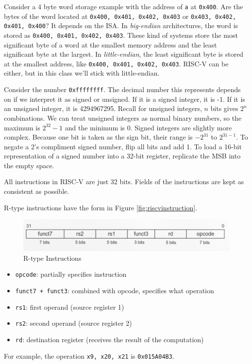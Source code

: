 Consider a 4 byte word storage example with the address
of \texttt{a} at \texttt{0x400}. Are the bytes of the word
located at \texttt{0x400, 0x401, 0x402, 0x403} or
\texttt{0x403, 0x402, 0x401, 0x400}? It depends on the
ISA. In \emph{big-endian} architectures, the word is
stored as \texttt{0x400, 0x401, 0x402, 0x403}. These kind
of systems store the most significant byte of a word at
the smallest memory address and the least significant
byte at the largest. In \emph{little-endian}, the least
significant byte is stored at the smallest address,
like \texttt{0x400, 0x401, 0x402, 0x403}. RISC-V can be
either, but in this class we'll stick with little-endian.

Consider the number \texttt{0xffffffff}.
The decimal number this represents depends
on if we interpret it as signed or unsigned.
If it is a signed integer, it is -1.
If it is an unsigned integer, it is
4294967295. Recall for unsigned integers,
$n$ bits gives $2^n$ combinations. We
can treat unsigned integers as normal
binary numbers, so the maximum is
$2^32 - 1$ and the minimum is 0.
Signed integers are slightly more
complex. Because one bit is taken
as the sign bit, their range is
$-2^{31}$ to $2^{31 - 1}$. To negate
a 2's compliment signed number, flip
all bits and add 1. To load a 16-bit
representation of a signed number into
a 32-bit register, replicate the MSB
into the empty space.

All instructions in RISC-V are just 32 bits.
Fields of the instructions are kept as
consistent as possible.

R-type instructions have the
form in Figure \ref{fig:riscvinstruction}.
\begin{figure}
    \includegraphics{images/rtype.png}
    \caption{R-type Instructions}
    \label{fig:rtype}
\end{figure}
\begin{itemize}
    \item \texttt{opcode}: partially specifies instruction
    \item \texttt{funct7 + funct3}: combined with opcode, specifies what operation
    \item \texttt{rs1}: first operand (source register 1)
    \item \texttt{rs2}: second operand (source register 2)
    \item \texttt{rd}: destination register (receives the result of the computation)
\end{itemize}
For example, the operation \texttt{x9, x20, x21}
is \texttt{0x015A04B3}.

